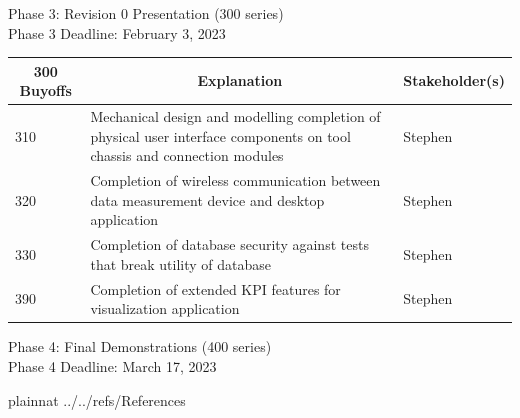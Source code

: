 \documentclass[12pt]{article}
\begin{document}
Phase 3: Revision 0 Presentation (300 series)\\
Phase 3 Deadline: February 3, 2023\\

\begin{table}[H]
  \centering
  \begin{tabular}{|p{2cm}|p{10cm}|p{2cm}|}
  \hline
  \multicolumn{1}{|c|}{\textbf{300 Buyoffs}} & \multicolumn{1}{c|}{\textbf{Explanation}} & \multicolumn{1}{|c|}{\textbf{Stakeholder(s)}}
  \\ \hline
  310
  & Mechanical design and modelling completion of physical user interface components on tool chassis and connection modules
  & Stephen
  \newline                                
  \\ \hline

  320                              
  & Completion of wireless communication between data measurement device and desktop application 
  & Stephen
  \newline                                
  \\ \hline

  330                          
  & Completion of database security against tests that break utility of database
  & Stephen
  \newline                                
  \\ \hline

  390                                
  & Completion of extended KPI features for visualization application
  & Stephen 
  \newline                            
  \\ \hline

  \end{tabular}
\end{table}
\newpage

Phase 4: Final Demonstrations (400 series)\\
Phase 4 Deadline: March 17, 2023\\






\newpage

 {plainnat}
 {../../refs/References}

\newpage

\noindent {}
\end{document}
